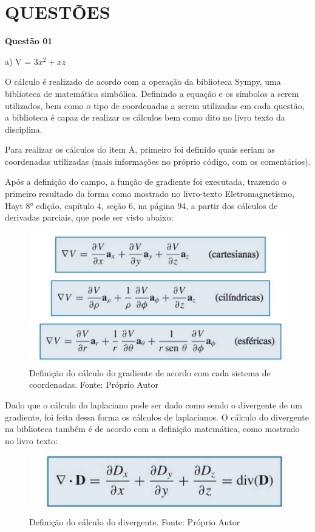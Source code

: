 \newpage

\section{QUESTÕES}

\textbf{Questão 01} 

a) V = $3x^2 + xz$

O cálculo é realizado de acordo com a operação da biblioteca Sympy, uma biblioteca de matemática simbólica. Definindo a equação e os símbolos a serem utilizados, bem como o tipo de coordenadas a serem utilizadas em cada questão, a biblioteca é capaz de realizar os cálculos bem como dito no livro texto da disciplina.

Para realizar os cálculos do item A, primeiro foi definido quais seriam as coordenadas utilizadas (mais informações no próprio código, com os comentários). 

Após a definição do campo, a função de gradiente foi executada, trazendo o primeiro resultado da forma como mostrado no livro-texto Eletromagnetismo, Hayt 8° edição, capítulo 4, seção 6, na página 94, 
a partir dos cálculos de derivadas parciais, que pode ser visto abaixo: 

\begin{figure}[!h]
	\centering
	\includegraphics[scale= 0.6]{images/gradiente.png}
	\caption{Definição do cálculo do gradiente de acordo com cada sistema de coordenadas. Fonte: Próprio Autor}
\end{figure}

Dado que o cálculo do laplaciano pode ser dado como sendo o divergente de um gradiente, foi feita dessa forma os cálculos de laplacianos. O cálculo do divergente na biblioteca também é de acordo com a definição matemática, como mostrado no livro texto: 

\begin{figure}[!h]
	\centering
	\includegraphics[scale= 0.6]{images/divergente.png}
	\caption{Definição do cálculo do divergente. Fonte: Próprio Autor}
\end{figure}

